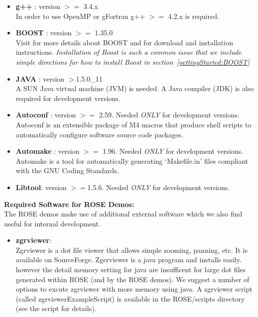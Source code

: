 \begin{itemize}
   \item {\bf g++} : version $>=$ 3.4.x  \\
     In order to use OpenMP or gFortran g++ $>=$ 4.2.x is required.

   \item {\bf BOOST} : version $>=$ 1.35.0  \\
     Visit 
     for more details about BOOST and 
     for download and installation instructions. 
     {\em Installation of Boost is such a common issue that we include simple directions for how to install Boost in section~\ref{gettingStarted:BOOST}}

   \item {\bf JAVA} : version $>$1.5.0\_11 \\
     A SUN Java virtual machine (JVM) is needed. A Java compiler (JDK) is also
     required for development versions.  

   \item {\bf Autoconf} : version $>=$ 2.59. Needed \emph{ONLY} for development versions. \\
     Autoconf is an extensible package of M4 macros that produce shell scripts to automatically configure software source code packages. 

   \item {\bf Automake} : version $>=$ 1.96. Needed \emph{ONLY} for development versions. \\
     Automake is a tool for automatically generating `Makefile.in' files compliant with
     the GNU Coding Standards.

   \item {\bf Libtool}: version $>=$1.5.6.  Needed \emph{ONLY} for development versions. 
\end{itemize}

{\bf Required Software for ROSE Demos:} \\
     The ROSE demos make use of additional external software which we also find useful for
     internal development.
\begin{itemize}
   \item {\bf zgrviewer}: \\
     Zgrviewer is a dot file viewer that allows simple zooming, panning, etc. It is
     available on SourceForge.  Zgerviewer is a java program and installs easily.
     however the detail memory setting for java are insufficent for large dot files
     generated within ROSE (and by the ROSE demos).  We suggest a number of options
     to excute zgrviewer with more memory using java.  A zgrviewer script (called
     zgrviewerExampleScript) is available in the ROSE/scripts directory (see the 
     script for details).

\end{itemize}


